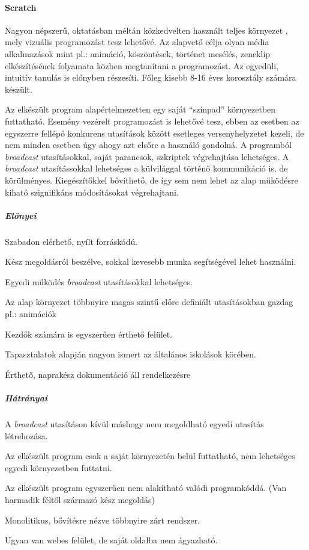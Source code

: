 \documentclass[12pt,a4paper,oneside]{report} %
\begin{document}
\paragraph{Scratch} 
\label{scratch}
Nagyon népszerű, oktatásban méltán közkedvelten használt teljes környezet \cite{maloney2010scratch, resnick2009scratch, ScratchUrl2019Jan}, mely vizuális programozást tesz lehetővé. Az alapvető célja olyan média alkalmazások mint pl.: animáció, köszöntések, történet mesélés, zeneklip elkészítésének folyamata közben megtanítani a programozást. Az egyedüli, intuitív tanulás is előnyben részesíti. Főleg kisebb 8-16 éves korosztály számára készült. 
\par Az elkészült program alapértelmezetten egy saját ``{színpad}'' környezetben futtatható. Esemény vezérelt programozást is lehetővé tesz, ebben az esetben az egyszerre fellépő konkurens utasítások között esetleges versenyhelyzetet kezeli, de nem minden esetben úgy ahogy azt elsőre a használó gondolná.  A programból \textit{broadcast} utasításokkal, saját parancsok, szkriptek végrehajtása lehetséges. A \textit{broadcast} utasítássokkal lehetséges a külvilággal történő kommunikáció is, de körülményes. Kiegészítőkkel bővíthető, de így sem nem lehet az alap működésre kiható szignifikáns módosításokat végrehajtani.
\subparagraph{Előnyei} 
\begin{compactitem}
	\item Szabadon elérhető, nyílt forráskódú.
	\item Kész megoldásról beszélve, sokkal kevesebb munka segítségével lehet használni.
	\item Egyedi működés \textit{broadcast} utasításokkal lehetséges.
	\item Az alap környezet többnyire magas szintű előre definiált utasításokban gazdag pl.: animációk
	\item Kezdők számára is egyszerűen érthető felület.
	\item Tapasztalatok alapján nagyon ismert az általános iskolások körében.
	\item Érthető, naprakész dokumentáció áll rendelkezésre
\end{compactitem}
\subparagraph{Hátrányai} 
\begin{compactitem}
	\item A \textit{broadcast} utasításon kívül máshogy nem megoldható egyedi utasítás létrehozása.
	\item Az elkészült program csak a saját környezetén belül futtatható, nem lehetséges egyedi környezetben futtatni.
	\item Az elkészült program egyszerűen nem alakítható valódi programkóddá. (Van harmadik féltől származó kész megoldás)
	\item Monolitikus, bővítésre nézve többnyire zárt rendszer.
	\item Ugyan van webes felület, de saját oldalba nem ágyazható.
\end{compactitem}
\end{document}
